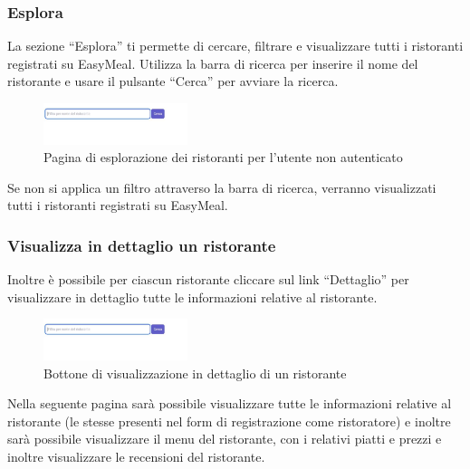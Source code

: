 \subsubsection{Esplora}
La sezione ``Esplora'' ti permette di cercare, filtrare e visualizzare tutti i ristoranti registrati su EasyMeal. 
Utilizza la barra di ricerca per inserire il nome del ristorante e usare il pulsante ``Cerca'' per avviare la ricerca.

\begin{figure}[htbp]
    \centering
    \includegraphics[width=0.375\textwidth]{./img/EsploraClienteNonAutenticato.jpg}
    \caption{Pagina di esplorazione dei ristoranti per l'utente non autenticato}
\end{figure}

Se non si applica un filtro attraverso la barra di ricerca, verranno visualizzati tutti i ristoranti registrati su EasyMeal.

\subsubsection{Visualizza in dettaglio un ristorante}
Inoltre è possibile per ciascun ristorante cliccare sul link ``Dettaglio'' per visualizzare in dettaglio tutte le informazioni relative al ristorante.

\begin{figure}[htbp]
    \centering
    \includegraphics[width=0.375\textwidth]{./img/Dettaglio.jpg}
    \caption{Bottone di visualizzazione in dettaglio di un ristorante}
\end{figure}

Nella seguente pagina sarà possibile visualizzare tutte le informazioni relative al ristorante (le stesse presenti nel form di registrazione come ristoratore) 
e inoltre sarà possibile visualizzare il menu del ristorante, con i relativi piatti e prezzi e inoltre visualizzare le recensioni del ristorante.


